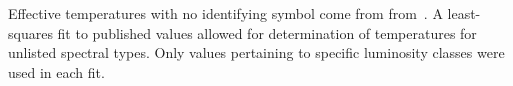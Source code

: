 
Effective temperatures with no identifying symbol come from from~\cite{Astrophysical_Quantities_Ed4}.  
A least-squares fit to published values allowed for determination of 
temperatures for unlisted spectral types.  Only values pertaining to specific 
luminosity classes were used in each fit.



